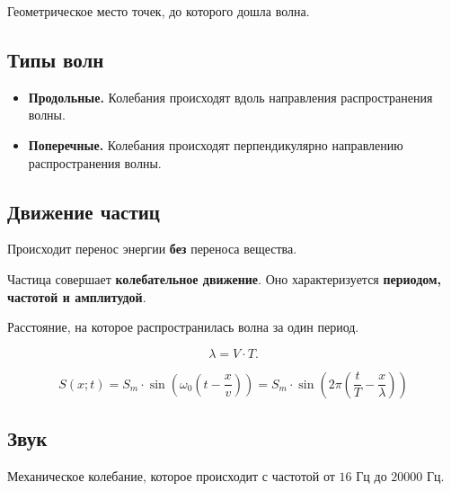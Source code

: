\documentclass[12pt]{article}
\begin{document}
	\begin{definition}
		Геометрическое место точек, до которого дошла волна.
	\end{definition}

	\subsection{Типы волн}

	\begin{itemize}
		\item \textbf{Продольные.} Колебания происходят вдоль направления распространения волны.
		\item \textbf{Поперечные.} Колебания происходят перпендикулярно направлению распространения волны.
	\end{itemize}

	\subsection{Движение частиц}

	\begin{statement}
		Происходит перенос энергии \textbf{без} переноса вещества.
	\end{statement}

	\begin{statement}
		Частица совершает \textbf{колебательное движение}. Оно характеризуется \textbf{периодом, частотой и амплитудой}.
	\end{statement}

	\begin{definition}
		Расстояние, на которое распространилась волна за один период.

		\[
			\lambda = V \cdot T.
		\]
	\end{definition}

	\begin{statement}
		\[
		S \left( x; t \right) = S_m \cdot \sin \left( \omega_0 \left( t - \frac{x}{v} \right) \right) = S_m \cdot \sin \left( 2 \pi \left( \frac{t}{T} - \frac{x}{\lambda} \right) \right)
		\]
	\end{statement}

	\subsection{Звук}

	\begin{definition}[Звук]
		Механическое колебание, которое происходит с частотой от $16$ Гц до $20000$ Гц.
	\end{definition}
\end{document}
